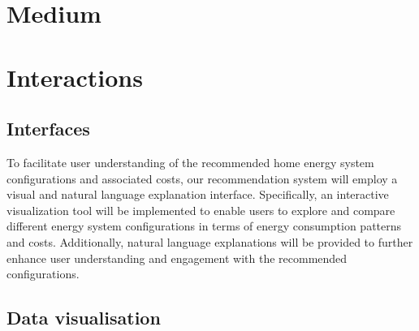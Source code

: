 \section{Medium}

\section{Interactions}

\subsection{Interfaces}

To facilitate user understanding of the recommended home energy system configurations and associated costs, our recommendation system will employ a visual and natural language explanation interface. 
Specifically, an interactive visualization tool will be implemented to enable users to explore and compare different energy system configurations in terms of energy consumption patterns and costs. 
Additionally, natural language explanations will be provided to further enhance user understanding and engagement with the recommended configurations. 


\subsection{Data visualisation}


